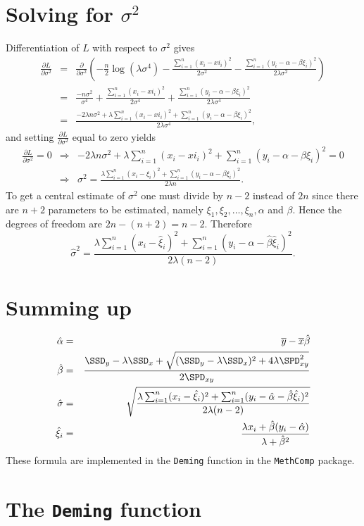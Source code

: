 \documentclass[a4paper,twoside,12pt]{article}
\begin{document}

\section{Solving for $\sigma^2$}
Differentiation of $L$ with respect to $\sigma^2$ gives
\begin{eqnarray*}
\frac{\partial L}{\partial\sigma^2}
&=&
\frac{\partial}{\partial\sigma^2}\left(
-\frac{n}{2}\log(\lambda\sigma^4)-\frac{\sum_{i=1}^n(x_i-xi_i)^2}{2\sigma^2}-\frac{\sum_{i=1}^n(y_i-\alpha-\beta\xi_i)^2}{2\lambda\sigma^2}
\right)\\[1em]
&=&
\frac{-n\sigma^2}{\sigma^4}+\frac{\sum_{i=1}^n(x_i-xi_i)^2}{2\sigma^4}+\frac{\sum_{i=1}^n(y_i-\alpha-\beta\xi_i)^2}{2\lambda\sigma^4}\\[1em]
&=&
\frac{-2\lambda n\sigma^2+\lambda\sum_{i=1}^n(x_i-xi_i)^2+\sum_{i=1}^n(y_i-\alpha-\beta\xi_i)^2}{2\lambda\sigma^4},
\end{eqnarray*}
and setting $\frac{\partial L}{\partial \sigma^2}$ equal to zero yields
\begin{eqnarray*}
\frac{\partial L}{\partial \sigma^2}=0
&\Rightarrow&
-2\lambda n\sigma^2+\lambda\sum_{i=1}^n(x_i-xi_i)^2+\sum_{i=1}^n(y_i-\alpha-\beta\xi_i)^2=0\\[1em]
&\Rightarrow&
\sigma^2=\frac{\lambda\sum_{i=1}^n(x_i-\xi_i)^2+\sum_{i=1}^n(y_i-\alpha-\beta\xi_i)^2}{2\lambda n}.
\end{eqnarray*}
To get a central estimate of $\sigma^2$ one must divide by $n-2$
instead of $2n$ since there are $n+2$ parameters to be estimated,
namely $\xi_1,\xi_2,\ldots,\xi_n,\alpha$ and $\beta$. Hence the
degrees of freedom are $2n-(n+2)=n-2$. Therefore
$$
\hat{\sigma}^2=\frac{\lambda\sum_{i=1}^n(x_i-\hat{\xi}_i)^2+\sum_{i=1}^n(y_i-\hat{\alpha}-\hat{\beta}\hat{\xi}_i)^2}{2\lambda (n-2)}.
$$
\section{Summing up}
\begin{eqnarray*}
\hat{\alpha} &=& \overline{y}-\overline{x}\hat{\beta}\\
\hat{\beta}    &=& \frac{\SSD_y-\lambda\SSD_x+\sqrt{(\SSD_y-\lambda\SSD_x)^2+4\lambda\SPD_{xy}^2}}{2\SPD_{xy}}\\
\hat{\sigma}   &=& \sqrt{\frac{\lambda\sum_{i=1}^n(x_i-\hat{\xi}_i)^2+\sum_{i=1}^n(y_i-\hat{\alpha}-\hat{\beta}\hat{\xi}_i)^2}{2\lambda (n-2)}}\\
\hat{\xi}_i    &=& \frac{\lambda x_i+\hat{\beta}(y_i-\hat{\alpha})}{\lambda+\hat{\beta}^2}
\end{eqnarray*}
These formula are implemented in the \texttt{Deming} function in the \texttt{MethComp} package.
\clearpage
\section{The \texttt{Deming} function}
 \scriptsize
 \renewcommand{\baselinestretch}{0.8}
 
 \renewcommand{\baselinestretch}{1.0}
 \normalsize
\end{document}
